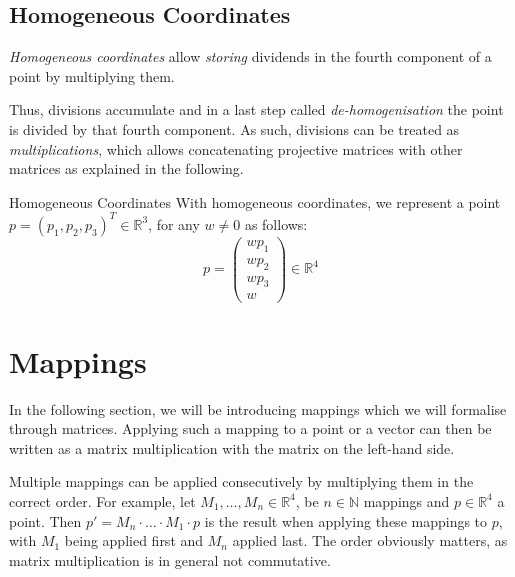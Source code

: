 \documentclass[english]{panikzettel}
\begin{document}
\subsection{Homogeneous Coordinates}
\begin{halfboxl}
\textit{Homogeneous coordinates} allow \emph{storing} dividends in the fourth component of a point by multiplying them.

Thus, divisions accumulate and in a last step called \emph{de-homogenisation} the point is divided by that fourth component. As such, divisions can be treated as \emph{multiplications}, which allows concatenating projective matrices with other matrices as explained in the following.
\end{halfboxl}%
\begin{halfboxr}
\vspace{-\baselineskip}
\begin{defi}{Homogeneous Coordinates}
With homogeneous coordinates, we represent a point $p = (p_1, p_2, p_3)^T \in \mathbb{R}^3$, for any $w \neq 0$ as follows:
$$p = \begin{pmatrix} wp_1 \\ wp_2 \\ wp_3 \\ w \end{pmatrix} \in \mathbb{R}^4$$
\end{defi}
\end{halfboxr}
\section{Mappings}

In the following section, we will be introducing mappings which we will formalise through matrices. Applying such a mapping to a point or a vector can then be written as a matrix multiplication with the matrix on the left-hand side.

Multiple mappings can be applied consecutively by multiplying them in the correct order. For example, let $M_1, \ldots , M_n \in \mathbb{R}^4$, be $n \in \mathbb{N}$ mappings and $p \in \mathbb{R}^4$ a point. Then $p'= M_n \cdot \ldots \cdot M_1 \cdot p$ is the result when applying these mappings to $p$, with $M_1$ being applied first and $M_n$ applied last. The order obviously matters, as matrix multiplication is in general not commutative.
\end{document}
